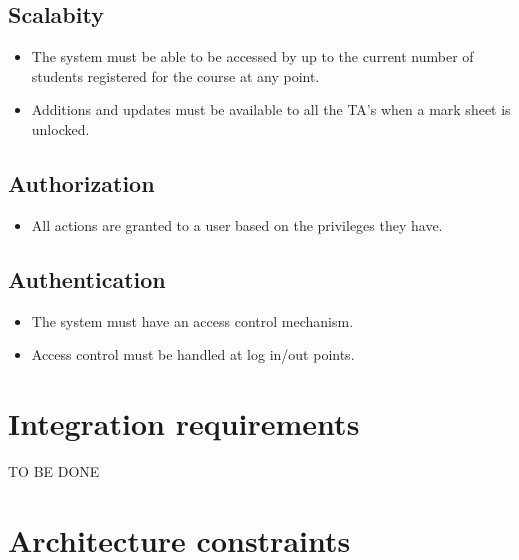 \documentclass[11pt,a4paper]{article}
\begin{document}
\subsection{Scalabity}
\begin{itemize}
\item The system must be able to be accessed by up to the current number of students registered for the course at any point.
\item Additions and updates must be available to all the TA's when a mark sheet is unlocked.
\end{itemize}
\subsection{Authorization}
\begin{itemize}
\item All actions are granted to a user based on the privileges they have.
\end{itemize}
\subsection{Authentication}
\begin{itemize}
\item The system must have an access control mechanism.
\item Access control must be handled at log in/out points.
\end{itemize}
\section{Integration requirements}
TO BE DONE
\section{Architecture constraints}
\end{document}
